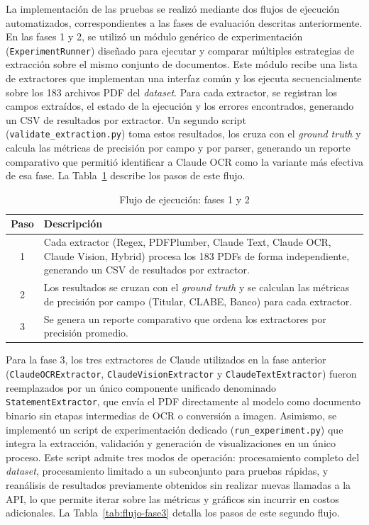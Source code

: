La implementación de las pruebas se realizó mediante dos flujos de ejecución automatizados, correspondientes a las fases de evaluación descritas anteriormente. En las fases 1 y 2, se utilizó un módulo genérico de experimentación (\texttt{ExperimentRunner}) diseñado para ejecutar y comparar múltiples estrategias de extracción sobre el mismo
conjunto de documentos. Este módulo recibe una lista de extractores que implementan una interfaz común y los ejecuta secuencialmente sobre los 183 archivos PDF del \textit{dataset}. Para cada extractor, se registran los campos extraídos, el estado de la ejecución y los errores encontrados, generando un CSV de resultados por extractor. Un segundo script (\texttt{validate\_extraction.py}) toma estos resultados, los cruza con el \textit{ground truth} y calcula las métricas de precisión por campo y por parser, generando un reporte comparativo que permitió identificar a Claude OCR como la variante más efectiva de esa fase. La Tabla~\ref{tab:flujo-fase12} describe los pasos de este flujo.

\begin{table}[H]
\centering
\vspace{6pt}
\begin{tabular}{c p{11cm}}
\toprule
\textbf{Paso} & \textbf{Descripción} \\
\midrule
1 & Cada extractor (Regex, PDFPlumber, Claude Text, Claude OCR, Claude Vision, Hybrid) procesa los 183 PDFs de forma independiente, generando un CSV de resultados por extractor. \\
2 & Los resultados se cruzan con el \textit{ground truth} y se calculan las métricas de precisión por campo (Titular, CLABE, Banco) para cada extractor. \\
3 & Se genera un reporte comparativo que ordena los extractores por precisión promedio. \\
\bottomrule
\end{tabular}
\caption{Flujo de ejecución: fases 1 y 2}
\label{tab:flujo-fase12}
\end{table}

Para la fase 3, los tres extractores de Claude utilizados en la fase anterior (\texttt{ClaudeOCR\-Extractor}, \texttt{ClaudeVisionExtractor} y \texttt{ClaudeTextExtractor}) fueron reemplazados por un único componente unificado denominado \texttt{StatementExtractor}, que envía el PDF directamente al modelo como documento binario sin etapas intermedias de OCR o conversión a imagen. Asimismo, se implementó un script de experimentación dedicado (\texttt{run\-\_experiment.py}) que integra la extracción, validación y generación de visualizaciones en un único proceso. Este script admite tres modos de operación: procesamiento completo del \textit{dataset}, procesamiento limitado a un subconjunto para pruebas rápidas, y reanálisis de resultados previamente obtenidos sin realizar nuevas llamadas a la API, lo que permite iterar sobre las métricas y gráficos sin incurrir en costos adicionales. La Tabla~\ref{tab:flujo-fase3} detalla los pasos de este segundo flujo.

